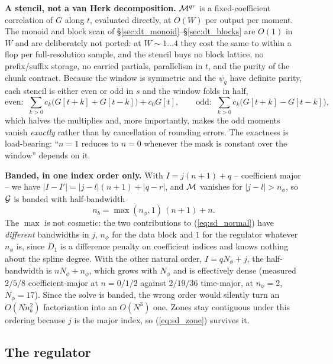 \documentclass{article}
\numberwithin{equation}{section}   %
\begin{document}
{\bf A stencil, not a van Herk decomposition.}  ${\cal M}^{qr}$ is a fixed-coefficient correlation of $G$ along
$t$, evaluated directly, at $O(W)$ per output per moment.  The monoid and block scan of
\S\ref{sec:dt_monoid}--\S\ref{sec:dt_blocks} are $O(1)$ in $W$ and are deliberately not ported: at
$W \sim 1\ldots4$ they cost the same to within a flop per full-resolution sample, and the stencil buys no block
lattice, no prefix/suffix storage, no carried partials, parallelism in $t$, and the purity of the chunk
contract.  Because the window is symmetric and the $\psi_q$ have definite parity, each stencil is either even
or odd in $s$ and the window folds in half,
\begin{equation}
\mbox{even:}\;\; \sum_{k>0} c_k\big(G[t{+}k] + G[t{-}k]\big) + c_0 G[t],
\qquad
\mbox{odd:}\;\; \sum_{k>0} c_k\big(G[t{+}k] - G[t{-}k]\big),
\label{eq:sd_parity}
\end{equation}
which halves the multiplies and, more importantly, makes the odd moments vanish {\em exactly} rather than by
cancellation of rounding errors.  The exactness is load-bearing: ``$n=1$ reduces to $n=0$ whenever the mask is
constant over the window'' depends on it.

{\bf Banded, in one index order only.}  With $I = j(n+1) + q$ -- coefficient major -- we have
$|I - I'| = |j-l|(n+1) + |q-r|$, and ${\cal M}$ vanishes for $|j-l| > n_\phi$, so ${\cal G}$ is banded with
half-bandwidth
\begin{equation}
n_b = \max(n_\phi, 1)\,(n+1) + n .
\label{eq:sd_bandwidth}
\end{equation}
The $\max$ is not cosmetic: the two contributions to (\ref{eq:sd_normal}) have {\em different} bandwidths in
$j$, $n_\phi$ for the data block and $1$ for the regulator whatever $n_\phi$ is, since $D_1$ is a difference
penalty on coefficient indices and knows nothing about the spline degree.  With the other natural order,
$I = qN_\phi + j$, the half-bandwidth is $nN_\phi + n_\phi$, which grows with $N_\phi$ and is effectively dense
(measured $2/5/8$ coefficient-major at $n = 0/1/2$ against $2/19/36$ time-major, at $n_\phi = 2$,
$N_\phi = 17$).  Since the solve is banded, the wrong order would silently turn an $O(N n_b^2)$ factorization
into an $O(N^3)$ one.  Zones stay contiguous under this ordering because $j$ is the major index, so
(\ref{eq:sd_zone}) survives it.

\subsection{The regulator}
\label{sec:sd_regulator}
\end{document}
